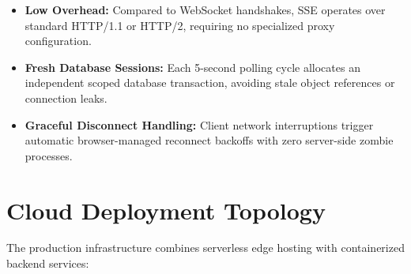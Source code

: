 \begin{itemize}
  \item \textbf{Low Overhead:} Compared to WebSocket handshakes, SSE operates over standard HTTP/1.1 or HTTP/2, requiring no specialized proxy configuration.
  \item \textbf{Fresh Database Sessions:} Each 5-second polling cycle allocates an independent scoped database transaction, avoiding stale object references or connection leaks.
  \item \textbf{Graceful Disconnect Handling:} Client network interruptions trigger automatic browser-managed reconnect backoffs with zero server-side zombie processes.
\end{itemize}

\section{Cloud Deployment Topology}

The production infrastructure combines serverless edge hosting with containerized backend services:

